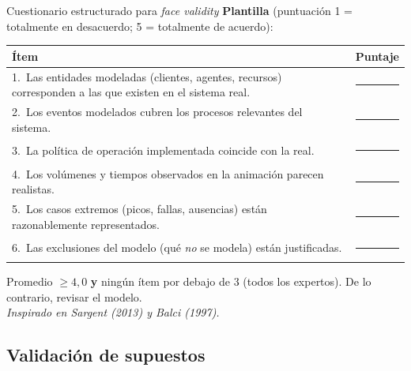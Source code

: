 \documentclass[aspectratio=1610, 10pt]{beamer}
\begin{document}
\begin{frame}{Cuestionario estructurado para \emph{face validity}}
  \footnotesize
  \textbf{Plantilla} (puntuación 1 = totalmente en desacuerdo;
  5 = totalmente de acuerdo):

  \vspace{2pt}
  \begin{center}
    \renewcommand{\arraystretch}{1.2}
    \begin{tabular}{p{10cm}c}
      \toprule
      \textbf{Ítem} & \textbf{Puntaje} \\
      \midrule
      1.\ Las entidades modeladas (clientes, agentes, recursos) corresponden
          a las que existen en el sistema real.
        & \rule[-2pt]{0.6cm}{0.4pt} \\
      2.\ Los eventos modelados cubren los procesos relevantes del sistema.
        & \rule[-2pt]{0.6cm}{0.4pt} \\
      3.\ La política de operación implementada coincide con la real.
        & \rule[-2pt]{0.6cm}{0.4pt} \\
      4.\ Los volúmenes y tiempos observados en la animación parecen realistas.
        & \rule[-2pt]{0.6cm}{0.4pt} \\
      5.\ Los casos extremos (picos, fallas, ausencias) están razonablemente
          representados.
        & \rule[-2pt]{0.6cm}{0.4pt} \\
      6.\ Las exclusiones del modelo (qué \emph{no} se modela) están justificadas.
        & \rule[-2pt]{0.6cm}{0.4pt} \\
      \bottomrule
    \end{tabular}
  \end{center}

  \vspace{4pt}
  \begin{notabox}[Criterio]
    \footnotesize
    Promedio $\geq 4{,}0$ \textbf{y} ningún ítem por debajo de 3 (todos los
    expertos). De lo contrario, revisar el modelo.\\
    \emph{Inspirado en Sargent (2013) y Balci (1997).}
  \end{notabox}
\end{frame}

\subsection{Validación de supuestos}
\end{document}
